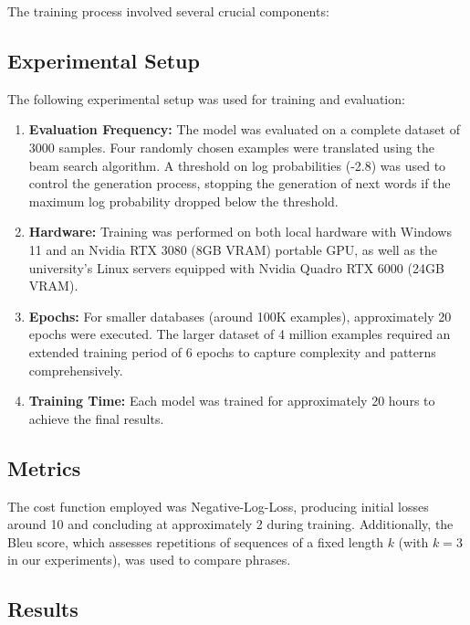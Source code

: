 The training process involved several crucial components:

\subsection{Experimental Setup}

The following experimental setup was used for training and evaluation:

\begin{enumerate}
    \item \textbf{Evaluation Frequency:} The model was evaluated on a complete dataset of 3000 samples. Four randomly chosen examples were translated using the beam search algorithm. A threshold on log probabilities (-2.8) was used to control the generation process, stopping the generation of next words if the maximum log probability dropped below the threshold.
    
    \item \textbf{Hardware:} Training was performed on both local hardware with Windows 11 and an Nvidia RTX 3080 (8GB VRAM) portable GPU, as well as the university's Linux servers equipped with Nvidia Quadro RTX 6000 (24GB VRAM).
    
    \item \textbf{Epochs:} For smaller databases (around 100K examples), approximately 20 epochs were executed. The larger dataset of 4 million examples required an extended training period of 6 epochs to capture complexity and patterns comprehensively.
    
    \item \textbf{Training Time:} Each model was trained for approximately 20 hours to achieve the final results.
\end{enumerate}

\subsection{Metrics}

The cost function employed was Negative-Log-Loss, producing initial losses around 10 and concluding at approximately 2 during training. Additionally, the Bleu score, which assesses repetitions of sequences of a fixed length $k$ (with $k=3$ in our experiments), was used to compare phrases.


\subsection{Results}

